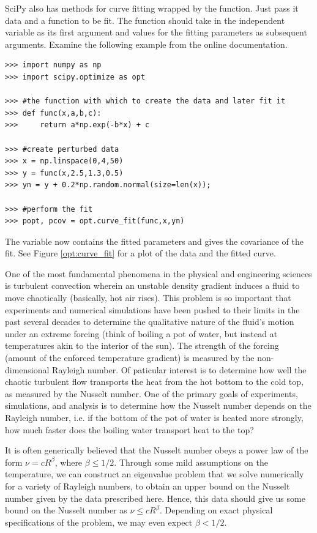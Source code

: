 SciPy also has methods for curve fitting wrapped by the  function.
Just pass it data and a function to be fit. 
The function should take in the independent variable as its first argument and values for the fitting parameters as subsequent arguments.
Examine the following example from the online documentation.
\begin{lstlisting}
>>> import numpy as np
>>> import scipy.optimize as opt

>>> #the function with which to create the data and later fit it
>>> def func(x,a,b,c):
>>>     return a*np.exp(-b*x) + c

>>> #create perturbed data
>>> x = np.linspace(0,4,50)
>>> y = func(x,2.5,1.3,0.5)
>>> yn = y + 0.2*np.random.normal(size=len(x));

>>> #perform the fit
>>> popt, pcov = opt.curve_fit(func,x,yn)
\end{lstlisting}
The variable  now contains the fitted parameters and  gives the covariance of the fit.
See Figure \ref{opt:curve_fit} for a plot of the data and the fitted curve.

One of the most fundamental phenomena in the physical and engineering sciences is turbulent convection wherein an unstable density gradient induces a fluid to move chaotically (basically, hot air rises).  
This problem is so important that experiments and numerical simulations have been pushed to their limits in the past several decades to determine the qualitative nature of the fluid's motion under an extreme forcing (think of boiling a pot of water, but instead at temperatures akin to the interior of the sun).  
The strength of the forcing (amount of the enforced temperature gradient) is measured by the non-dimensional Rayleigh number.  
Of paticular interest is to determine how well the chaotic turbulent flow transports the heat from the hot bottom to the cold top, as measured by the Nusselt number.  
One of the primary goals of experiments, simulations, and analysis is to determine how the Nusselt number depends on the Rayleigh number, i.e. if the bottom of the pot of water is heated more strongly, how much faster does the boiling water transport heat to the top?

It is often generically believed that the Nusselt number obeys a power law of the form $\nu = cR^\beta$, where $\beta \le 1/2$.  
Through some mild assumptions on the temperature, we can construct an eigenvalue problem that we solve numerically for a variety of Rayleigh numbers, to obtain an upper bound on the Nusselt number given by the data prescribed here.  
Hence, this data should give us some bound on the Nusselt number as $\nu \le cR^\beta$.  Depending on exact physical specifications of the problem, we may even expect $\beta < 1/2$.

